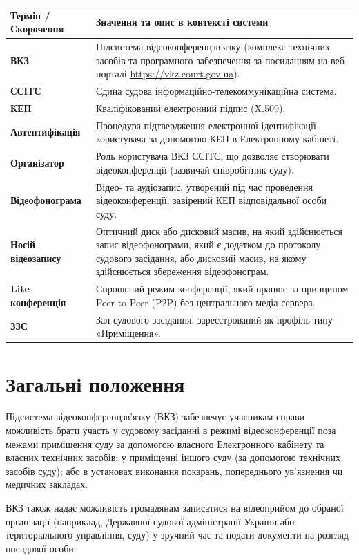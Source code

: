 \documentclass{article}
\begin{document}
\begin{longtable}{p{4cm}p{10cm}}
\toprule
\textbf{Термін / Скорочення} & \textbf{Значення та опис в контексті системи} \\
\midrule
\textbf{ВКЗ} & Підсистема відеоконференцзв'язку (комплекс технічних засобів та програмного забезпечення за посиланням на веб-порталі \url{https://vkz.court.gov.ua}). \\
\textbf{ЄСІТС} & Єдина судова інформаційно-телекоммунікаційна система. \\
\textbf{КЕП} & Кваліфікований електронний підпис (X.509). \\
\textbf{Автентифікація} & Процедура підтвердження електронної ідентифікації користувача за допомогою КЕП в Електронному кабінеті. \\
\textbf{Організатор} & Роль користувача ВКЗ ЄСІТС, що дозволяє створювати відеоконференції (зазвичай співробітник суду). \\
\textbf{Відеофонограма} & Відео- та аудіозапис, утворений під час проведення відеоконференції, завірений КЕП відповідальної особи суду. \\
\textbf{Носій відеозапису} & Оптичний диск або дисковий масив, на який здійснюється запис відеофонограми, який є додатком до протоколу судового засідання, або дисковий масив, на якому здійснюється збереження відеофонограм. \\
\textbf{Lite конференція} & Спрощений режим конференції, який працює за принципом Peer-to-Peer (P2P) без центрального медіа-сервера. \\
\textbf{ЗЗС} & Зал судового засідання, зареєстрований як профіль типу «Приміщення». \\
\bottomrule
\end{longtable}

\section{Загальні положення}

Підсистема відеоконференцзв'язку (ВКЗ) забезпечує учасникам справи можливість брати участь у судовому засіданні в режимі відеоконференції поза межами приміщення суду за допомогою власного Електронного кабінету та власних технічних засобів; у приміщенні іншого суду (за допомогою технічних засобів суду); або в установах виконання покарань, попереднього ув'язнення чи медичних закладах.

ВКЗ також надає можливість громадянам записатися на відеоприйом до обраної організації (наприклад, Державної судової адміністрації України або територіального управління, суду) у зручний час та подати документи на розгляд посадової особи.
\end{document}
